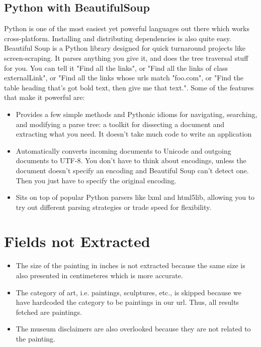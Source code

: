 \documentclass{article}
\begin{document}
\begin{flushleft}
\subsection{Python with BeautifulSoup}
Python is one of the most easiest yet powerful languages out there which works cross-platform. Installing and distributing dependencies is also quite easy. Beautiful Soup is a Python library designed for quick turnaround projects like screen-scraping.
It parses anything you give it, and does the tree traversal stuff for you. You can tell it "Find all the links", or "Find all the links of class externalLink", or "Find all the links whose urls match "foo.com", or "Find the table heading that's got bold text, then give me that text.". Some of the features that make it powerful are:
\begin{itemize}
\item Provides a few simple methods and Pythonic idioms for navigating, searching, and modifying a parse tree: a toolkit for dissecting a document and extracting what you need. It doesn't take much code to write an application
\item {Automatically converts incoming documents to Unicode and outgoing documents to UTF-8. You don't have to think about encodings, unless the document doesn't specify an encoding and Beautiful Soup can't detect one. Then you just have to specify the original encoding.}
\item{Sits on top of popular Python parsers like lxml and html5lib, allowing you to try out different parsing strategies or trade speed for flexibility.}
\end{itemize}

\section{Fields not Extracted}
\begin{itemize}
\item The size of the painting in inches is not extracted because the same size is also presented in centimeteres which is more accurate.
\item The category of art, i.e. paintings, sculptures, etc., is skipped because we have hardcoded the category to be paintings in our url. Thus, all results fetched are paintings.
\item The museum disclaimers are also overlooked because they are not related to the painting.
\end{itemize}

\end{flushleft}
\end{document}
